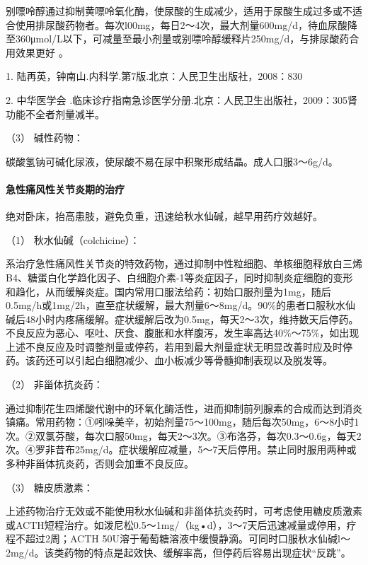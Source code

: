 别嘌呤醇通过抑制黄嘌呤氧化酶，使尿酸的生成减少，适用于尿酸生成过多或不适合使用排尿酸药物者。每次l00mg，每日2～4次，最大剂量600mg/d，待血尿酸降至360μmol/L以下，可减量至最小剂量或别嘌呤醇缓释片250mg/d，与排尿酸药合用效果更好
。

1. 陆再英，钟南山.内科学.第7版.北京：人民卫生出版社，2008：830

2. 中华医学会
.临床诊疗指南急诊医学分册.北京：人民卫生出版社，2009：305肾功能不全者剂量减半。

\hypertarget{text00125.htmlux5cux23CHP4-15-3-2-3}{}
（3） 碱性药物：

碳酸氢钠可碱化尿液，使尿酸不易在尿中积聚形成结晶。成人口服3～6g/d。

\paragraph{急性痛风性关节炎期的治疗}

绝对卧床，抬高患肢，避免负重，迅速给秋水仙碱，越早用药疗效越好。

\hypertarget{text00125.htmlux5cux23CHP4-15-3-3-1}{}
（1） 秋水仙碱（colchicine）：

系治疗急性痛风性关节炎的特效药物，通过抑制中性粒细胞、单核细胞释放白三烯B4、糖蛋白化学趋化因子、白细胞介素-1等炎症因子，同时抑制炎症细胞的变形和趋化，从而缓解炎症。国内常用口服法给药：初始口服剂量为1mg，随后0.5mg/h或1mg/2h，直至症状缓解，最大剂量6～8mg/d。90\%的患者口服秋水仙碱后48小时内疼痛缓解。症状缓解后改为0.5mg，每天2～3次，维持数天后停药。不良反应为恶心、呕吐、厌食、腹胀和水样腹泻，发生率高达40\%～75\%，如出现上述不良反应及时调整剂量或停药，若用到最大剂量症状无明显改善时应及时停药。该药还可以引起白细胞减少、血小板减少等骨髓抑制表现以及脱发等。

\hypertarget{text00125.htmlux5cux23CHP4-15-3-3-2}{}
（2） 非甾体抗炎药：

通过抑制花生四烯酸代谢中的环氧化酶活性，进而抑制前列腺素的合成而达到消炎镇痛。常用药物：①吲哚美辛，初始剂量75～100mg，随后每次50mg，6～8小时1次。②双氯芬酸，每次口服50mg，每天2～3次。③布洛芬，每次0.3～0.6g，每天2次。④罗非昔布25mg/d。症状缓解应减量，5～7天后停用。禁止同时服用两种或多种非甾体抗炎药，否则会加重不良反应。

\hypertarget{text00125.htmlux5cux23CHP4-15-3-3-3}{}
（3） 糖皮质激素：

上述药物治疗无效或不能使用秋水仙碱和非甾体抗炎药时，可考虑使用糖皮质激素或ACTH短程治疗。如泼尼松0.5～1mg/（kg•d），3～7天后迅速减量或停用，疗程不超过2周；ACTH
50U溶于葡萄糖溶液中缓慢静滴。可同时口服秋水仙碱l～2mg/d。该类药物的特点是起效快、缓解率高，但停药后容易出现症状“反跳”。

